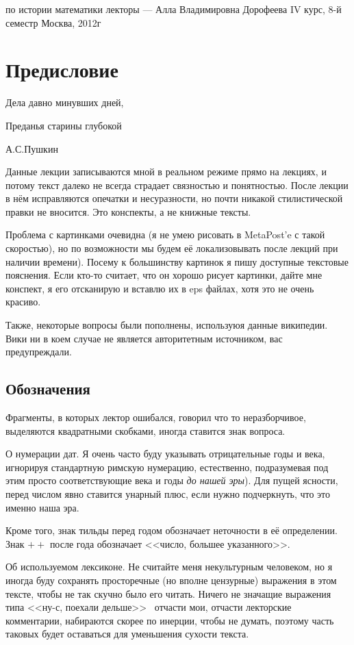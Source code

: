 \documentclass[a4paper,oneside,fleqn,10pt]{article}
\begin{document}
 {по истории математики} {лекторы --- Алла
  Владимировна Дорофеева} {IV курс, 8-й семестр} {Москва, 2012г}
\section*{Предисловие}
\epigraph{Дела давно минувших дней, \par Преданья старины
  глубокой}{А.С.Пушкин}

Данные лекции записываются мной в реальном режиме прямо на лекциях, и
потому текст далеко не всегда страдает связностью и понятностью.
После лекции в нём исправляются опечатки и несуразности, но почти
никакой стилистической правки не вносится. Это конспекты, а не книжные
тексты.

Проблема с картинками очевидна (я не умею рисовать в MetaPost'e с
такой скоростью), но по возможности мы будем её локализовывать после
лекций при наличии времени).  Посему к большинству картинок я пишу
доступные текстовые пояснения.  Если кто-то считает, что он хорошо
рисует картинки, дайте мне конспект, я его отсканирую и вставлю их в
eps файлах, хотя это не очень красиво.

Также, некоторые вопросы были пополнены, используюя данные википедии.
Вики ни в коем случае не является авторитетным источником, вас
предупреждали.
\subsection*{Обозначения}

Фрагменты, в которых лектор ошибался, говорил что то неразборчивое,
выделяются квадратными скобками, иногда ставится знак вопроса.

О нумерации дат. Я очень часто буду указывать отрицательные годы и
века, игнорируя стандартную римскую нумерацию, естественно,
подразумевая под этим просто соответствующие века и годы \emph{до
  нашей эры}).  Для пущей ясности, перед числом явно ставится унарный
плюс, если нужно подчеркнуть, что это именно наша эра.

Кроме того, знак тильды перед годом обозначает неточности в её
определении.  Знак ${+}{+}$ после года обозначает <<число, большее
указанного>>.

Об используемом лексиконе. Не считайте меня некультурным человеком, но
я иногда буду сохранять просторечные (но вполне цензурные) выражения в
этом тексте, чтобы не так скучно было его читать. Ничего не значащие
выражения типа <<ну-с, поехали дельше>>~ отчасти мои, отчасти
лекторские комментарии, набираются скорее по инерции, чтобы не думать,
поэтому часть таковых будет оставаться для уменьшения сухости текста.
\end{document}
